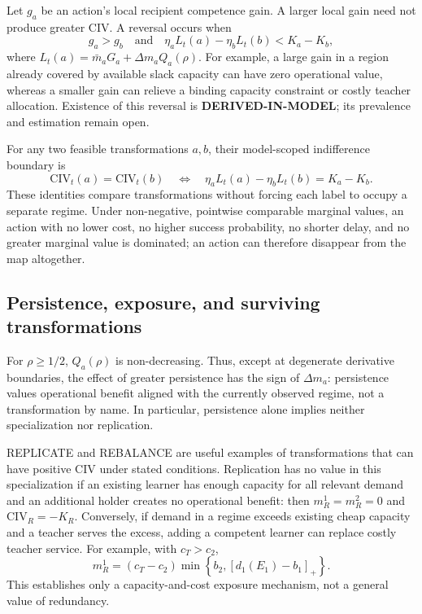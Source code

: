 Let $g_a$ be an action's local recipient competence gain. A larger local gain need not produce greater CIV. A reversal occurs when
\begin{equation}
g_a>g_b\quad\text{and}\quad
\eta_aL_t(a)-\eta_bL_t(b)<K_a-K_b,
\label{eq:civ-reversal}
\end{equation}
where $L_t(a)=\bar m_aG_a+\Delta m_aQ_a(\rho)$. For example, a large gain in a region already covered by available slack capacity can have zero operational value, whereas a smaller gain can relieve a binding capacity constraint or costly teacher allocation. Existence of this reversal is \textbf{DERIVED-IN-MODEL}; its prevalence and estimation remain open.

For any two feasible transformations $a,b$, their model-scoped indifference boundary is
\begin{equation}
\mathrm{CIV}_t(a)=\mathrm{CIV}_t(b)
\quad\Longleftrightarrow\quad
\eta_aL_t(a)-\eta_bL_t(b)=K_a-K_b.
\label{eq:civ-boundary}
\end{equation}
These identities compare transformations without forcing each label to occupy a separate regime. Under non-negative, pointwise comparable marginal values, an action with no lower cost, no higher success probability, no shorter delay, and no greater marginal value is dominated; an action can therefore disappear from the map altogether.

\subsection{Persistence, exposure, and surviving transformations}

For $\rho\geq1/2$, $Q_a(\rho)$ is non-decreasing. Thus, except at degenerate derivative boundaries, the effect of greater persistence has the sign of $\Delta m_a$: persistence values operational benefit aligned with the currently observed regime, not a transformation by name. In particular, persistence alone implies neither specialization nor replication.

REPLICATE and REBALANCE are useful examples of transformations that can have positive CIV under stated conditions. Replication has no value in this specialization if an existing learner has enough capacity for all relevant demand and an additional holder creates no operational benefit: then $m_R^1=m_R^2=0$ and $\mathrm{CIV}_R=-K_R$. Conversely, if demand in a regime exceeds existing cheap capacity and a teacher serves the excess, adding a competent learner can replace costly teacher service. For example, with $c_T>c_2$,
\begin{equation}
m_R^1=(c_T-c_2)\min\!\left\{b_2,\left[d_1(E_1)-b_1\right]_+\right\}.
\label{eq:civ-replication-capacity}
\end{equation}
This establishes only a capacity-and-cost exposure mechanism, not a general value of redundancy.

